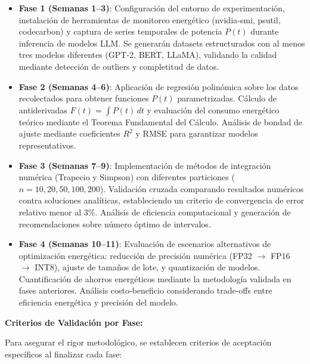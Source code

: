 \begin{itemize}
    \item \textbf{Fase 1 (Semanas 1--3)}: Configuración del entorno de experimentación, instalación de herramientas de monitoreo energético (nvidia-smi, psutil, codecarbon) y captura de series temporales de potencia $P(t)$ durante inferencia de modelos LLM. Se generarán datasets estructurados con al menos tres modelos diferentes (GPT-2, BERT, LLaMA), validando la calidad mediante detección de outliers y completitud de datos.
    
    \item \textbf{Fase 2 (Semanas 4--6)}: Aplicación de regresión polinómica sobre los datos recolectados para obtener funciones $P(t)$ parametrizadas. Cálculo de antiderivadas $F(t) = \int P(t) \, dt$ y evaluación del consumo energético teórico mediante el Teorema Fundamental del Cálculo. Análisis de bondad de ajuste mediante coeficientes $R^2$ y RMSE para garantizar modelos representativos.
    
    \item \textbf{Fase 3 (Semanas 7--9)}: Implementación de métodos de integración numérica (Trapecio y Simpson) con diferentes particiones ($n = 10, 20, 50, 100, 200$). Validación cruzada comparando resultados numéricos contra soluciones analíticas, estableciendo un criterio de convergencia de error relativo menor al 3\%. Análisis de eficiencia computacional y generación de recomendaciones sobre número óptimo de intervalos.
    
    \item \textbf{Fase 4 (Semanas 10--11)}: Evaluación de escenarios alternativos de optimización energética: reducción de precisión numérica (FP32 $\to$ FP16 $\to$ INT8), ajuste de tamaños de lote, y quantización de modelos. Cuantificación de ahorros energéticos mediante la metodología validada en fases anteriores. Análisis costo-beneficio considerando trade-offs entre eficiencia energética y precisión del modelo.
\end{itemize}

\textbf{Criterios de Validación por Fase:}

Para asegurar el rigor metodológico, se establecen criterios de aceptación específicos al finalizar cada fase:

